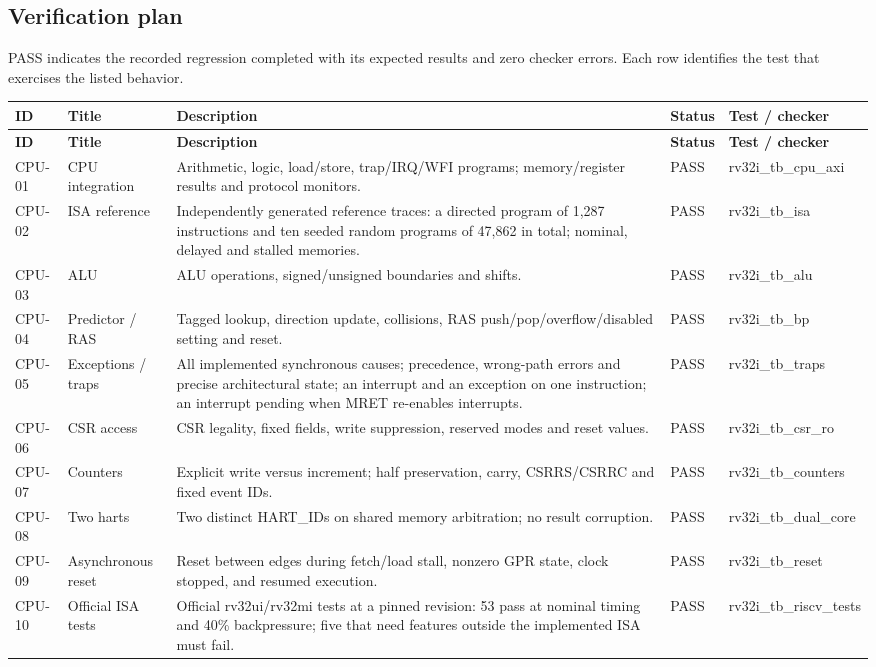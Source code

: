 \documentclass[11pt]{article}
\begin{document}
\subsection{Verification plan}
\noindent PASS indicates the recorded regression completed with its expected results and zero checker errors. Each row identifies the test that exercises the listed behavior.\par\medskip
{\small
\begin{longtable}{@{}L{0.0800\dimexpr\linewidth-48pt\relax}L{0.1600\dimexpr\linewidth-48pt\relax}L{0.3700\dimexpr\linewidth-48pt\relax}L{0.1000\dimexpr\linewidth-48pt\relax}L{0.2900\dimexpr\linewidth-48pt\relax}@{}}
\toprule
\textbf{ID} & \textbf{Title} & \textbf{Description} & \textbf{Status} & \textbf{Test / checker} \\ \midrule
\endfirsthead
\toprule
\textbf{ID} & \textbf{Title} & \textbf{Description} & \textbf{Status} & \textbf{Test / checker} \\ \midrule
\endhead
CPU-01 & CPU integration & Arithmetic, logic, load/store, trap/IRQ/WFI programs; memory/register results and protocol monitors. & PASS & rv32i\_tb\_cpu\_axi \\ \addlinespace[3pt]
CPU-02 & ISA reference & Independently generated reference traces: a directed program of 1,287 instructions and ten seeded random programs of 47,862 in total; nominal, delayed and stalled memories. & PASS & rv32i\_tb\_isa \\ \addlinespace[3pt]
CPU-03 & ALU & ALU operations, signed/unsigned boundaries and shifts. & PASS & rv32i\_tb\_alu \\ \addlinespace[3pt]
CPU-04 & Predictor / RAS & Tagged lookup, direction update, collisions, RAS push/pop/overflow/disabled setting and reset. & PASS & rv32i\_tb\_bp \\ \addlinespace[3pt]
CPU-05 & Exceptions / traps & All implemented synchronous causes; precedence, wrong-path errors and precise architectural state; an interrupt and an exception on one instruction; an interrupt pending when MRET re-enables interrupts. & PASS & rv32i\_tb\_traps \\ \addlinespace[3pt]
CPU-06 & CSR access & CSR legality, fixed fields, write suppression, reserved modes and reset values. & PASS & rv32i\_tb\_csr\_ro \\ \addlinespace[3pt]
CPU-07 & Counters & Explicit write versus increment; half preservation, carry, CSRRS/CSRRC and fixed event IDs. & PASS & rv32i\_tb\_counters \\ \addlinespace[3pt]
CPU-08 & Two harts & Two distinct HART\_IDs on shared memory arbitration; no result corruption. & PASS & rv32i\_tb\_dual\_core \\ \addlinespace[3pt]
CPU-09 & Asynchronous reset & Reset between edges during fetch/load stall, nonzero GPR state, clock stopped, and resumed execution. & PASS & rv32i\_tb\_reset \\ \addlinespace[3pt]
CPU-10 & Official ISA tests & Official rv32ui/rv32mi tests at a pinned revision: 53 pass at nominal timing and 40\% backpressure; five that need features outside the implemented ISA must fail. & PASS & rv32i\_tb\_riscv\_tests \\*
\bottomrule\end{longtable}}
\end{document}
